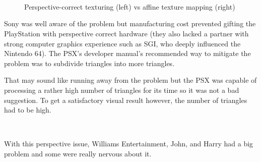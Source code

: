 \par
\begin{figure}[H] \centering
\begin{minipage}{\textwidth}
 \hspace{2cm}
\\
\par

 \hspace{2cm}
\\
\par

 \hspace{2cm}
\\
\par
\end{minipage}
\caption{Perspective-correct texturing (left) vs affine texture mapping (right)}
\label{texture_anmgle}
\end{figure}
\par

\pagebreak


Sony was well aware of the problem but manufacturing cost prevented gifting the PlayStation with perspective correct hardware (they also lacked a partner with strong computer graphics experience such as SGI, who deeply influenced the Nintendo 64). The PSX's developer manual's recommended way to mitigate the problem was to subdivide triangles into more triangles.\\
\par
 That may sound like running away from the problem but the PSX was capable of processing a rather high number of triangles for its time so it was not a bad suggestion. To get a satisfactory visual result however, the number of triangles had to be high.\\
\par
{}\\
\par
With this perspective issue, Williams Entertainment, John, and Harry had a big problem and some were really nervous about it.

